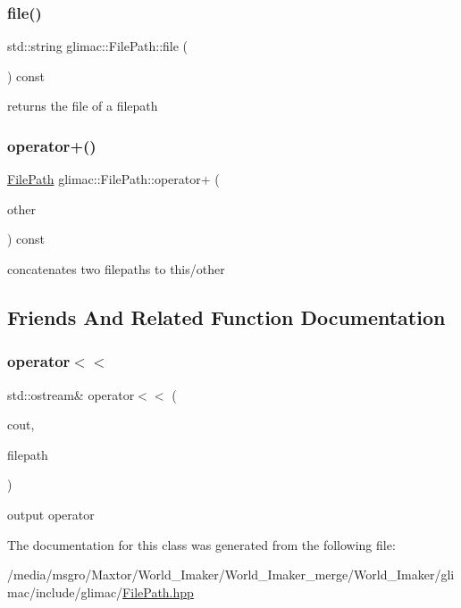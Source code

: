 \subsubsection{\texorpdfstring{file()}{file()}}
{\footnotesize\ttfamily std\+::string glimac\+::\+File\+Path\+::file (\begin{DoxyParamCaption}{ }\end{DoxyParamCaption}) const\hspace{0.3cm}{\ttfamily [inline]}}

returns the file of a filepath \mbox{\label{classglimac_1_1FilePath_a8113825c73d8a8f1f1cf3ca57de6bad8}} 
\subsubsection{\texorpdfstring{operator+()}{operator+()}}
{\footnotesize\ttfamily \hyperlink{classglimac_1_1FilePath}{File\+Path} glimac\+::\+File\+Path\+::operator+ (\begin{DoxyParamCaption}\item[{const \hyperlink{classglimac_1_1FilePath}{File\+Path} \&}]{other }\end{DoxyParamCaption}) const\hspace{0.3cm}{\ttfamily [inline]}}

concatenates two filepaths to this/other 

\subsection{Friends And Related Function Documentation}
\mbox{\label{classglimac_1_1FilePath_a924c4e68c4618cf40156646d23ec5f1c}} 
\subsubsection{\texorpdfstring{operator$<$$<$}{operator<<}}
{\footnotesize\ttfamily std\+::ostream\& operator$<$$<$ (\begin{DoxyParamCaption}\item[{std\+::ostream \&}]{cout,  }\item[{const \hyperlink{classglimac_1_1FilePath}{File\+Path} \&}]{filepath }\end{DoxyParamCaption})\hspace{0.3cm}{\ttfamily [friend]}}

output operator 

The documentation for this class was generated from the following file\+:\begin{DoxyCompactItemize}
\item 
/media/msgro/\+Maxtor/\+World\+\_\+\+Imaker/\+World\+\_\+\+Imaker\+\_\+merge/\+World\+\_\+\+Imaker/glimac/include/glimac/\hyperlink{FilePath_8hpp}{File\+Path.\+hpp}\end{DoxyCompactItemize}
